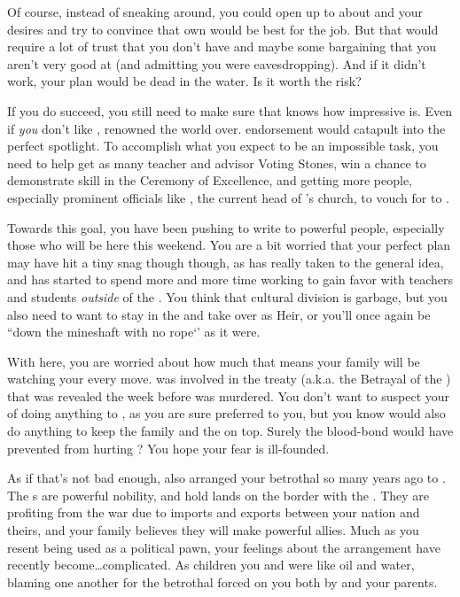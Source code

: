 \documentclass[char]{GL2020}
\begin{document}
Of course, instead of sneaking around, you could open up to \cDiplomat{} about \cAmbition{} and your desires and try to convince \cDiplomat{\them} that \cDiplomat{\their} own \cAmbition{\offspring} would be best for the job. But that would require a lot of trust that you don’t have and maybe some bargaining that you aren’t very good at (and admitting you were eavesdropping). And if it didn’t work, your plan would be dead in the water. Is it worth the risk? 

If you do succeed, you still need to make sure that \cDiplomat{} knows how impressive \cAmbition{} is. Even if \emph{you} don’t like \cDiplomat{\them}, \cDiplomat{\theyare} renowned the world over. \cDiplomat{\Their} endorsement would catapult \cAmbition{} into the perfect spotlight. To accomplish what you expect to be an impossible task, you need to help \cAmbition{\them} get as many teacher and advisor Voting Stones, win a chance to demonstrate \cAmbition{\their} skill in the Ceremony of Excellence, and getting more people, especially prominent \pTech{} officials like \cAntiChup{\full}, the current head of \cTechGod{}’s church, to vouch for \cAmbition{\them} to \cDiplomat{}. 

Towards this goal, you have been pushing \cAmbition{} to write to powerful people, especially those who will be here this weekend. You are a bit worried that your perfect plan may have hit a tiny snag though though, as \cAmbition{} has really taken to the general idea, and has started to spend more and more time working to gain favor with teachers and students \emph{outside} of the \pTech{}. You think that cultural division is garbage, but you also need \cAmbition{\them} to want to stay in the \pTech{} and take over as Heir, or you’ll once again be ``down the mineshaft with no rope‘’ as it were.    

With \cDiplomat{} here, you are worried about how much that means your family will be watching your every move. \cDiplomat{} was involved in the treaty (a.k.a. the Betrayal of the \pShippies{}) that was revealed the week before \cHeirSibling{} was murdered. You don’t want to suspect your \cDiplomat{\auncle} of doing anything to \cHeirSibling{}, as you are sure \cDiplomat{\they} preferred \cHeirSibling{\them} to you, but you know \cDiplomat{\they} would also do anything to keep the family and the \pTechies{} on top. Surely the blood-bond would have prevented \cDiplomat{} from hurting \cHeirSibling{}? You hope your fear is ill-founded. 

As if that's not bad enough, \cDiplomat{} also arranged your betrothal so many years ago to \cChupStudent{}. The \cChupStudent{\formal}s are powerful \pFarm{} nobility, and hold lands on the border with the \pTech{}. They are profiting from the war due to imports and exports between your nation and theirs, and your family believes they will make powerful allies. Much as you resent being used as a political pawn, your feelings about the arrangement have recently become\ldots complicated. As children you and \cChupStudent{} were like oil and water, blaming one another for the betrothal forced on you both by \cDiplomat{} and your parents.
\end{document}
